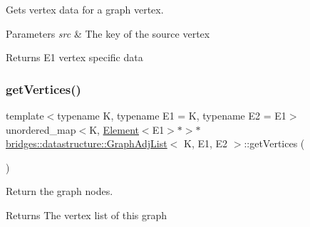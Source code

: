 Gets vertex data for a graph vertex. 


\begin{DoxyParams}{Parameters}
{\em src} & The key of the source vertex\\
\hline
\end{DoxyParams}
\begin{DoxyReturn}{Returns}
E1 vertex specific data 
\end{DoxyReturn}
\mbox{\label{classbridges_1_1datastructure_1_1_graph_adj_list_af91334de325f4be241c3c939ea9c5a36}} 
\subsubsection{\texorpdfstring{get\+Vertices()}{getVertices()}\hspace{0.1cm}{\footnotesize\ttfamily [1/2]}}
{\footnotesize\ttfamily template$<$typename K, typename E1 = K, typename E2 = E1$>$ \\
unordered\+\_\+map$<$K, \hyperlink{classbridges_1_1datastructure_1_1_element}{Element}$<$E1$>$$\ast$$>$$\ast$ \hyperlink{classbridges_1_1datastructure_1_1_graph_adj_list}{bridges\+::datastructure\+::\+Graph\+Adj\+List}$<$ K, E1, E2 $>$\+::get\+Vertices (\begin{DoxyParamCaption}{ }\end{DoxyParamCaption})\hspace{0.3cm}{\ttfamily [inline]}}



Return the graph nodes. 

\begin{DoxyReturn}{Returns}
The vertex list of this graph 
\end{DoxyReturn}
\mbox{\label{classbridges_1_1datastructure_1_1_graph_adj_list_a77b21cfdb87c4cf45ce29be6e7dd9791}} 
